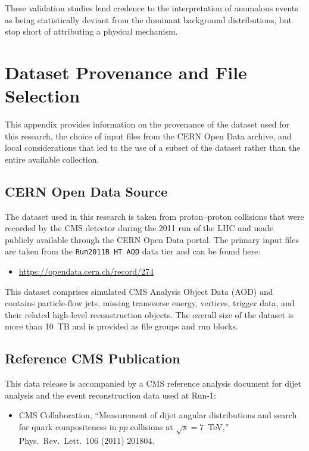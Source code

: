 \documentclass[11pt,a4paper,twocolumn]{article}
\begin{document}
These validation studies lend credence to the interpretation of anomalous events as being statistically deviant from the dominant background distributions, but stop short of attributing a physical mechanism.

\section{Dataset Provenance and File Selection}
\label{app:dataset}

This appendix provides information on the provenance of the dataset used for this research, the choice of input files from the CERN Open Data archive, and local considerations that led to the use of a subset of the dataset rather than the entire available collection.

\subsection{CERN Open Data Source}

The dataset used in this research is taken from proton--proton collisions that were recorded by the CMS detector during the 2011 run of the LHC and made publicly available through the CERN Open Data portal. The primary input files are taken from the \texttt{Run2011B HT AOD} data tier and can be found here:
\begin{itemize}
    \item \url{https://opendata.cern.ch/record/274}
\end{itemize}

This dataset comprises simulated CMS Analysis Object Data (AOD) and contains particle-flow jets, missing transverse energy, vertices, trigger data, and their related high-level reconstruction objects. The overall size of the dataset is more than 10~TB and is provided as file groups and run blocks.

\subsection{Reference CMS Publication}

This data release is accompanied by a CMS reference analysis document for dijet analysis and the event reconstruction data used at Run-1:
\begin{itemize}
    \item CMS Collaboration, ``Measurement of dijet angular distributions and search for quark compositeness in $pp$ collisions at $\sqrt{s}=7$~TeV,'' Phys.\ Rev.\ Lett.\ 106 (2011) 201804.
\end{itemize}
\end{document}
